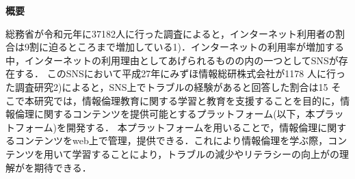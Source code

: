\begin{center}
{\bf \Large 概要}
\end{center} 
総務省が令和元年に37182人に行った調査によると，インターネット利用者の割合は9割に迫るところまで増加している1)．インターネットの利用率が増加する中，インターネットの利用理由としてあげられるものの内の一つとしてSNSが存在する．
このSNSにおいて平成27年にみずほ情報総研株式会社が1178 人に行った調査研究2)によると，SNS上でトラブルの経験があると回答した割合は15%
そこで本研究では，情報倫理教育に関する学習と教育を支援することを目的に，情報倫理に関するコンテンツを提供可能とするプラットフォーム(以下，本プラットフォーム)を開発する．
本プラットフォームを用いることで，情報倫理に関するコンテンツをweb上で管理，提供できる．これにより情報倫理を学ぶ際，コンテンツを用いて学習することにより，トラブルの減少やリテラシーの向上がの理解がを期待できる．
